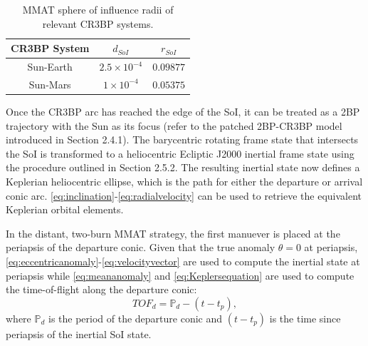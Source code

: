 \begin{table}[ht]
    \centering
    \caption{MMAT sphere of influence radii of relevant CR3BP systems.}
    \begin{tabular}{|c|c|c|}
        \hline
        \textbf{CR3BP System}   &   \boldmath$d_{SoI}$  &   \boldmath$r_{SoI}$  \\  \hline
        Sun-Earth               &   $2.5\times10^{-4}$  &   $0.09877$           \\  \hline
        Sun-Mars                &   $1\times10^{-4}$    &   $0.05375$           \\  \hline
    \end{tabular}
    \label{tab:SoI}
\end{table}

Once the CR3BP arc has reached the edge of the SoI, it can be treated as a 2BP trajectory with the
Sun as its focus (refer to the patched 2BP-CR3BP model introduced in Section 2.4.1). The
barycentric rotating frame state that intersects the SoI is transformed to a heliocentric Ecliptic
J2000 inertial frame state using the procedure outlined in Section 2.5.2. The resulting inertial
state now defines a Keplerian heliocentric ellipse, which is the path for either the departure or
arrival conic arc. \cref{eq:inclination}-\cref{eq:radialvelocity} can be used to retrieve the
equivalent Keplerian orbital elements.

In the distant, two-burn MMAT strategy, the first manuever is placed at the periapsis of the
departure conic. Given that the true anomaly $\theta=0$ at periapsis,
\cref{eq:eccentricanomaly}-\cref{eq:velocityvector} are used to compute the inertial state at
periapsis while \cref{eq:meananomaly} and \cref{eq:Keplersequation} are used to compute the
time-of-flight along the departure conic:
\begin{equation}
    TOF_{d}=\mathbb{P}_{d}-(t-t_{p}),
    \label{eq:departureTOF}
\end{equation}
where $\mathbb{P}_{d}$ is the period of the departure conic and $(t-t_{p})$ is the time since
periapsis of the inertial SoI state.

